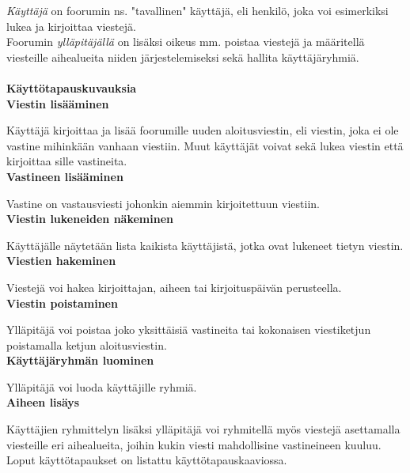 \documentclass[12pt,a4paper,leqno]{report}
\begin{document}
\emph{Käyttäjä} on foorumin ns. "tavallinen"  käyttäjä, eli henkilö, joka voi esimerkiksi lukea ja kirjoittaa viestejä.\\

Foorumin \emph{ylläpitäjällä} on lisäksi oikeus mm. poistaa viestejä ja määritellä viesteille aihealueita niiden järjestelemiseksi sekä hallita käyttäjäryhmiä.\\ \\

\Large\textbf{Käyttötapauskuvauksia}\normalsize\\

\textbf{Viestin lisääminen}

\noindent Käyttäjä kirjoittaa ja lisää foorumille uuden aloitusviestin, eli viestin, joka ei ole vastine mihinkään vanhaan viestiin. Muut käyttäjät voivat sekä lukea viestin että kirjoittaa sille vastineita.\\

\textbf{Vastineen lisääminen}

\noindent Vastine on vastausviesti johonkin aiemmin kirjoitettuun viestiin.\\

\textbf{Viestin lukeneiden näkeminen}

\noindent Käyttäjälle näytetään lista kaikista käyttäjistä, jotka ovat lukeneet tietyn viestin.\\

\textbf{Viestien hakeminen}

\noindent Viestejä voi hakea kirjoittajan, aiheen tai kirjoituspäivän perusteella.\\

\textbf{Viestin poistaminen}

\noindent Ylläpitäjä voi poistaa joko yksittäisiä vastineita tai kokonaisen viestiketjun poistamalla ketjun aloitusviestin.\\

\textbf{Käyttäjäryhmän luominen}

\noindent Ylläpitäjä voi luoda käyttäjille ryhmiä.\\

\textbf{Aiheen lisäys}

\noindent Käyttäjien ryhmittelyn lisäksi ylläpitäjä voi ryhmitellä myös viestejä asettamalla viesteille eri aihealueita, joihin kukin viesti mahdollisine vastineineen kuuluu.\\

\noindent Loput käyttötapaukset on listattu käyttötapauskaaviossa.
\end{document}
